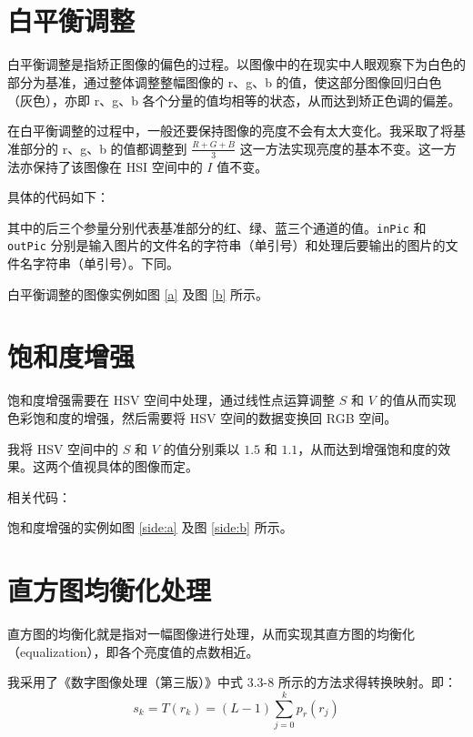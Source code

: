 \documentclass[a4paper,10pt]{article}
\theoremstyle{definition}
\theoremstyle{plain}
\begin{document}
\title{\Title \titlename\\  \vicetitle}
\author{\myauthor}
\maketitle

\section{白平衡调整}
白平衡调整是指矫正图像的偏色的过程。以图像中的在现实中人眼观察下为白色的部分为基准，通过整体调整整幅图像的 r、g、b 的值，使这部分图像回归白色（灰色），亦即 r、g、b 各个分量的值均相等的状态，从而达到矫正色调的偏差。

在白平衡调整的过程中，一般还要保持图像的亮度不会有太大变化。我采取了将基准部分的 r、g、b 的值都调整到 $\frac{R + G + B}{3}$ 这一方法实现亮度的基本不变。这一方法亦保持了该图像在 HSI 空间中的 $I$ 值不变。

具体的代码如下：


其中的后三个参量分别代表基准部分的红、绿、蓝三个通道的值。{\tt inPic} 和 {\tt outPic} 分别是输入图片的文件名的字符串（单引号）和处理后要输出的图片的文件名字符串（单引号）。下同。

白平衡调整的图像实例如图 \ref{a} 及图 \ref{b} 所示。




\section{饱和度增强}
饱和度增强需要在 HSV 空间中处理，通过线性点运算调整 $S$ 和 $V$ 的值从而实现色彩饱和度的增强，然后需要将 HSV 空间的数据变换回 RGB 空间。

我将 HSV 空间中的 $S$ 和 $V$ 的值分别乘以 $1.5$ 和 $1.1$，从而达到增强饱和度的效果。这两个值视具体的图像而定。

相关代码：


饱和度增强的实例如图 \ref{side:a} 及图 \ref{side:b} 所示。

\section{直方图均衡化处理}
直方图的均衡化就是指对一幅图像进行处理，从而实现其直方图的均衡化（{\xesl equalization}），即各个亮度值的点数相近。

我采用了《数字图像处理（第三版）》中式 3.3-8 所示的方法求得转换映射。即：
\begin{equation}
s_k=T(r_k)=(L-1)\sum_{j=0}^{k}p_r(r_j)
\end{equation}
\end{document}
